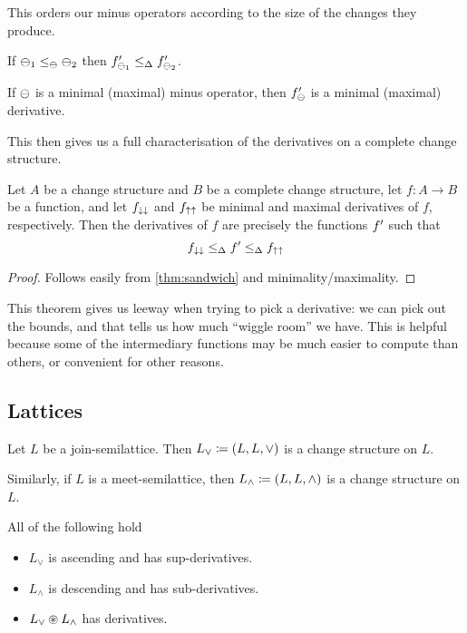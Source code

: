 This orders our minus operators according to the size of the changes they
produce. 

\begin{prop}
  If $\ominus_1 \leq_\ominus \ominus_2$ then
  $f'_{\ominus_1} \leq_\Delta f'_{\ominus_2}$.
\end{prop}

\begin{prop}
  If $\ominus$ is a minimal (maximal) minus operator, then $f'_\ominus$
  is a minimal (maximal) derivative.
\end{prop}

This then gives us a full characterisation of the derivatives on a complete
change structure.

\begin{thm}
\label{thm:derivativeCharacterization}
  Let $A$ be a change structure and $B$ be a complete change structure, let
  $f: A \rightarrow B$ be a function, and let $f_{\downarrow\downarrow}$ and
  $f_{\uparrow\uparrow}$ be minimal and maximal derivatives of $f$, respectively.
  Then the derivatives of $f$ are precisely
  the functions $f'$ such that
  $$f_{\downarrow\downarrow} \leq_\Delta f' \leq_\Delta f_{\uparrow\uparrow}$$
\end{thm}
\begin{proof}
  Follows easily from \ref{thm:sandwich} and minimality/maximality.
\end{proof}

This theorem gives us leeway when trying to pick a derivative: we can pick out the
bounds, and that tells us how much ``wiggle room'' we have. This is helpful
because some of the intermediary functions may be much easier to compute than
others, or convenient for other reasons.

\subsection{Lattices}

\begin{defn}
  Let $L$ be a join-semilattice. Then $L_\vee \coloneqq (L,L,\vee)$ is a change
  structure on $L$.

  Similarly, if $L$ is a meet-semilattice, then $L_\wedge \coloneqq (L,L,\wedge)$ is a change
  structure on $L$.
\end{defn}

\begin{prop}
  All of the following hold
  \begin{itemize}
    \item $L_\vee$ is ascending and has sup-derivatives.
    \item $L_\wedge$ is descending and has sub-derivatives.
    \item $L_\vee \circledast L_\wedge$ has derivatives.
  \end{itemize}
\end{prop}

